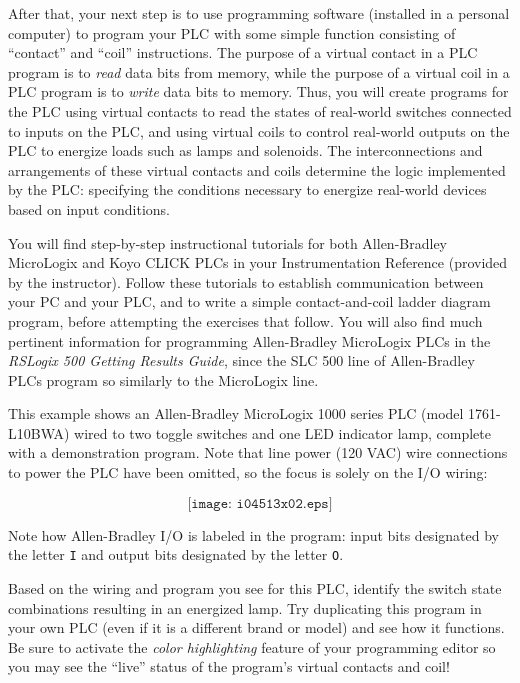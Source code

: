 \vskip 10pt

After that, your next step is to use programming software (installed in a personal computer) to program your PLC with some simple function consisting of ``contact'' and ``coil'' instructions.  The purpose of a virtual contact in a PLC program is to {\it read} data bits from memory, while the purpose of a virtual coil in a PLC program is to {\it write} data bits to memory.  Thus, you will create programs for the PLC using virtual contacts to read the states of real-world switches connected to inputs on the PLC, and using virtual coils to control real-world outputs on the PLC to energize loads such as lamps and solenoids.  The interconnections and arrangements of these virtual contacts and coils determine the logic implemented by the PLC: specifying the conditions necessary to energize real-world devices based on input conditions.

\vskip 10pt

You will find step-by-step instructional tutorials for both Allen-Bradley MicroLogix and Koyo CLICK PLCs in your Instrumentation Reference (provided by the instructor).  Follow these tutorials to establish communication between your PC and your PLC, and to write a simple contact-and-coil ladder diagram program, before attempting the exercises that follow.  You will also find much pertinent information for programming Allen-Bradley MicroLogix PLCs in the {\it RSLogix 500 Getting Results Guide}, since the SLC 500 line of Allen-Bradley PLCs program so similarly to the MicroLogix line.

\filbreak

This example shows an Allen-Bradley MicroLogix 1000 series PLC (model 1761-L10BWA) wired to two toggle switches and one LED indicator lamp, complete with a demonstration program.  Note that line power (120 VAC) wire connections to power the PLC have been omitted, so the focus is solely on the I/O wiring:

$$\texttt{[image: i04513x02.eps]}$$

Note how Allen-Bradley I/O is labeled in the program: input bits designated by the letter {\tt I} and output bits designated by the letter {\tt O}.

Based on the wiring and program you see for this PLC, identify the switch state combinations resulting in an energized lamp.  Try duplicating this program in your own PLC (even if it is a different brand or model) and see how it functions.  Be sure to activate the {\it color highlighting} feature of your programming editor so you may see the ``live'' status of the program's virtual contacts and coil!

